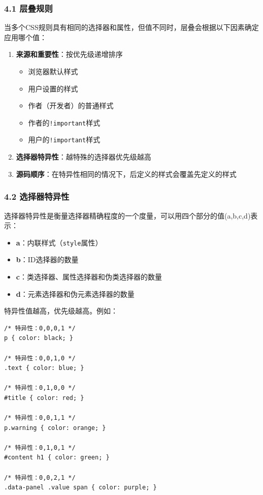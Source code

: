 \subsubsection{4.1 层叠规则}\label{ux5c42ux53e0ux89c4ux5219}

当多个CSS规则具有相同的选择器和属性，但值不同时，层叠会根据以下因素确定应用哪个值：

\begin{enumerate}
\def\labelenumi{\arabic{enumi}.}
\tightlist
\item
  \textbf{来源和重要性}：按优先级递增排序

  \begin{itemize}
  \tightlist
  \item
    浏览器默认样式
  \item
    用户设置的样式
  \item
    作者（开发者）的普通样式
  \item
    作者的\passthrough{\lstinline"!important"}样式
  \item
    用户的\passthrough{\lstinline"!important"}样式
  \end{itemize}
\item
  \textbf{选择器特异性}：越特殊的选择器优先级越高
\item
  \textbf{源码顺序}：在特异性相同的情况下，后定义的样式会覆盖先定义的样式
\end{enumerate}

\subsubsection{4.2
选择器特异性}\label{ux9009ux62e9ux5668ux7279ux5f02ux6027}

选择器特异性是衡量选择器精确程度的一个度量，可以用四个部分的值(a,b,c,d)表示：

\begin{itemize}
\tightlist
\item
  \textbf{a}：内联样式（\passthrough{\lstinline!style!}属性）
\item
  \textbf{b}：ID选择器的数量
\item
  \textbf{c}：类选择器、属性选择器和伪类选择器的数量
\item
  \textbf{d}：元素选择器和伪元素选择器的数量
\end{itemize}

特异性值越高，优先级越高。例如：

\begin{lstlisting}
/* 特异性：0,0,0,1 */
p { color: black; }

/* 特异性：0,0,1,0 */
.text { color: blue; }

/* 特异性：0,1,0,0 */
#title { color: red; }

/* 特异性：0,0,1,1 */
p.warning { color: orange; }

/* 特异性：0,1,0,1 */
#content h1 { color: green; }

/* 特异性：0,0,2,1 */
.data-panel .value span { color: purple; }
\end{lstlisting}

